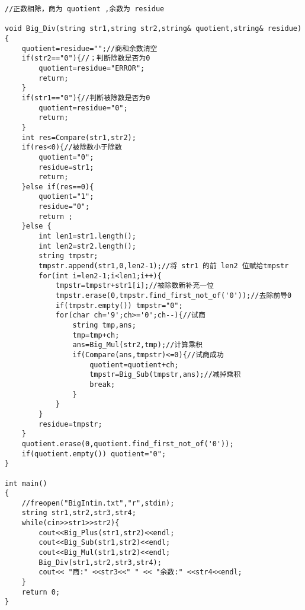\begin{lstlisting}
//正数相除，商为 quotient ,余数为 residue

void Big_Div(string str1,string str2,string& quotient,string& residue)
{
    quotient=residue="";//商和余数清空
    if(str2=="0"){//；判断除数是否为0
        quotient=residue="ERROR";
        return;
    }
    if(str1=="0"){//判断被除数是否为0
        quotient=residue="0";
        return;
    }
    int res=Compare(str1,str2);
    if(res<0){//被除数小于除数
        quotient="0";
        residue=str1;
        return;
    }else if(res==0){
        quotient="1";
        residue="0";
        return ;
    }else {
        int len1=str1.length();
        int len2=str2.length();
        string tmpstr;
        tmpstr.append(str1,0,len2-1);//将 str1 的前 len2 位赋给tmpstr
        for(int i=len2-1;i<len1;i++){
            tmpstr=tmpstr+str1[i];//被除数新补充一位
            tmpstr.erase(0,tmpstr.find_first_not_of('0'));//去除前导0
            if(tmpstr.empty()) tmpstr="0";
            for(char ch='9';ch>='0';ch--){//试商
                string tmp,ans;
                tmp=tmp+ch;
                ans=Big_Mul(str2,tmp);//计算乘积
                if(Compare(ans,tmpstr)<=0){//试商成功
                    quotient=quotient+ch;
                    tmpstr=Big_Sub(tmpstr,ans);//减掉乘积
                    break;
                }
            }
        }
        residue=tmpstr;
    }
    quotient.erase(0,quotient.find_first_not_of('0'));
    if(quotient.empty()) quotient="0";
}

int main()
{
    //freopen("BigIntin.txt","r",stdin);
    string str1,str2,str3,str4;
    while(cin>>str1>>str2){
        cout<<Big_Plus(str1,str2)<<endl;
        cout<<Big_Sub(str1,str2)<<endl;
        cout<<Big_Mul(str1,str2)<<endl;
        Big_Div(str1,str2,str3,str4);
        cout<< "商:" <<str3<<" " << "余数:" <<str4<<endl;
    }
    return 0;
}
\end{lstlisting}


